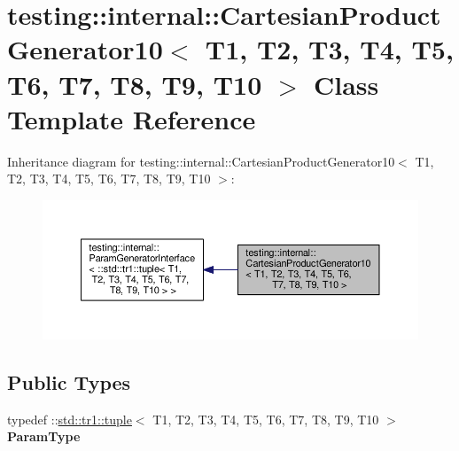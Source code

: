 \hypertarget{classtesting_1_1internal_1_1_cartesian_product_generator10}{}\section{testing\+:\+:internal\+:\+:Cartesian\+Product\+Generator10$<$ T1, T2, T3, T4, T5, T6, T7, T8, T9, T10 $>$ Class Template Reference}
\label{classtesting_1_1internal_1_1_cartesian_product_generator10}


Inheritance diagram for testing\+:\+:internal\+:\+:Cartesian\+Product\+Generator10$<$ T1, T2, T3, T4, T5, T6, T7, T8, T9, T10 $>$\+:
\nopagebreak
\begin{figure}[H]
\begin{center}
\leavevmode
\includegraphics[width=350pt]{classtesting_1_1internal_1_1_cartesian_product_generator10__inherit__graph}
\end{center}
\end{figure}
\subsection*{Public Types}
\begin{DoxyCompactItemize}
\item 
\mbox{\label{classtesting_1_1internal_1_1_cartesian_product_generator10_aa483a5910f5dbfb974b43f93853f4b29}} 
typedef \+::\mbox{\hyperlink{classstd_1_1tr1_1_1tuple}{std\+::tr1\+::tuple}}$<$ T1, T2, T3, T4, T5, T6, T7, T8, T9, T10 $>$ {\bfseries Param\+Type}
\end{DoxyCompactItemize}
